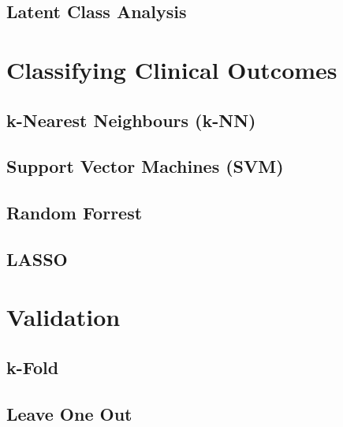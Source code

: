 \documentclass[../thesis.tex]{subfiles}
\begin{document}
\subsection{Latent Class Analysis}
\label{subsec:lca}

\section{Classifying Clinical Outcomes}
\label{sec:classify_clin_out}

\subsection{k-Nearest Neighbours (k-NN)}
\label{subsec:knn}

\subsection{Support Vector Machines (SVM)}
\label{subsec:svm}

\subsection{Random Forrest}
\label{subsec:random_forr}

\subsection{LASSO}
\label{subsec:lasso}

\section{Validation}
\label{sec:validation}

\subsection{k-Fold}
\label{subsec:k_fold}

\subsection{Leave One Out}
\label{subsec:loocv}
\end{document}
